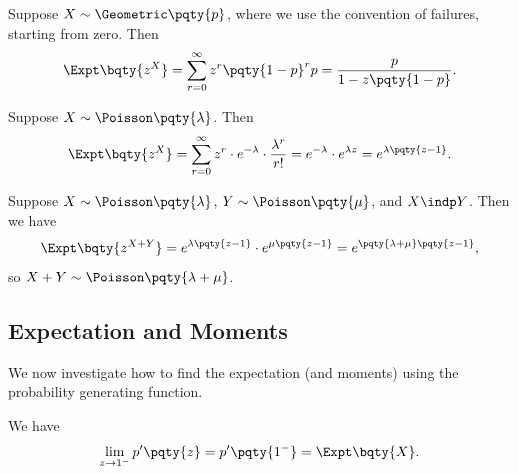 \begin{example}
    \label{ex:pgf-geometric}%
    Suppose \(X \sim \Geometric\pqty{p}\), where we use the convention of failures, starting from zero. Then
    \[
        \Expt\bqty{z^X} = \sum_{r = 0}^{\infty} z^r \pqty{1 - p}^r p = \frac{p}{1 - z\pqty{1 - p}}.
    \]
\end{example}

\begin{example}
    \label{ex:pgf-poisson}%
    Suppose \(X \sim \Poisson\pqty{\lambda}\). Then
    \[
        \Expt\bqty{z^X} = \sum_{r = 0}^{\infty} z^r \cdot e^{-\lambda} \cdot \frac{\lambda^r}{r!} = e^{-\lambda} \cdot e^{\lambda z} = e^{\lambda \pqty{z - 1}}.
    \]
\end{example}

\begin{example}
    Suppose \(X \sim \Poisson\pqty{\lambda}\), \(Y \sim \Poisson\pqty{\mu}\), and \(X \indp Y\). Then we have
    \[
        \Expt\bqty{z^{X + Y}} = e^{\lambda \pqty{z - 1}} \cdot e^{\mu\pqty{z - 1}} = e^{\pqty{\lambda + \mu} \pqty{z - 1}},
    \]
    so \(X + Y \sim \Poisson\pqty{\lambda + \mu}\).
\end{example}

\subsection{Expectation and Moments}

We now investigate how to find the expectation (and moments) using the probability generating function.

\begin{theorem}
    \label{thm:expt-pgf}%
    We have
    \[
        \lim_{z \to 1^{-}} p'\pqty{z} = p'\pqty{1^{-}} = \Expt\bqty{X}.
    \]
\end{theorem}

